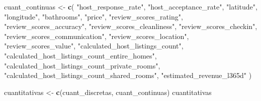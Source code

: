 \documentclass[
]{article}
\newenvironment{Shaded}{\begin{snugshade}}{\end{snugshade}}
\newcommand{\FunctionTok}[1]{\textcolor[rgb]{0.13,0.29,0.53}{\textbf{#1}}}
\newcommand{\NormalTok}[1]{#1}
\newcommand{\OtherTok}[1]{\textcolor[rgb]{0.56,0.35,0.01}{#1}}
\newcommand{\StringTok}[1]{\textcolor[rgb]{0.31,0.60,0.02}{#1}}
\begin{document}
\begin{Shaded}
\begin{Highlighting}[]
\NormalTok{cuant\_continuas }\OtherTok{\textless{}{-}} \FunctionTok{c}\NormalTok{(}
    \StringTok{"host\_response\_rate"}\NormalTok{,}
    \StringTok{"host\_acceptance\_rate"}\NormalTok{,}
    \StringTok{"latitude"}\NormalTok{,}
    \StringTok{"longitude"}\NormalTok{,}
    \StringTok{"bathrooms"}\NormalTok{,}
    \StringTok{"price"}\NormalTok{,}
    \StringTok{"review\_scores\_rating"}\NormalTok{,}
    \StringTok{"review\_scores\_accuracy"}\NormalTok{,}
    \StringTok{"review\_scores\_cleanliness"}\NormalTok{,}
    \StringTok{"review\_scores\_checkin"}\NormalTok{,}
    \StringTok{"review\_scores\_communication"}\NormalTok{,}
    \StringTok{"review\_scores\_location"}\NormalTok{,}
    \StringTok{"review\_scores\_value"}\NormalTok{,}
    \StringTok{"calculated\_host\_listings\_count"}\NormalTok{,}
    \StringTok{"calculated\_host\_listings\_count\_entire\_homes"}\NormalTok{,}
    \StringTok{"calculated\_host\_listings\_count\_private\_rooms"}\NormalTok{,}
    \StringTok{"calculated\_host\_listings\_count\_shared\_rooms"}\NormalTok{,}
    \StringTok{"estimated\_revenue\_l365d"}
\NormalTok{)}

\NormalTok{cuantitativas }\OtherTok{\textless{}{-}} \FunctionTok{c}\NormalTok{(cuant\_discretas, cuant\_continuas)}
\NormalTok{cuantitativas}
\end{Highlighting}
\end{Shaded}
\end{document}
